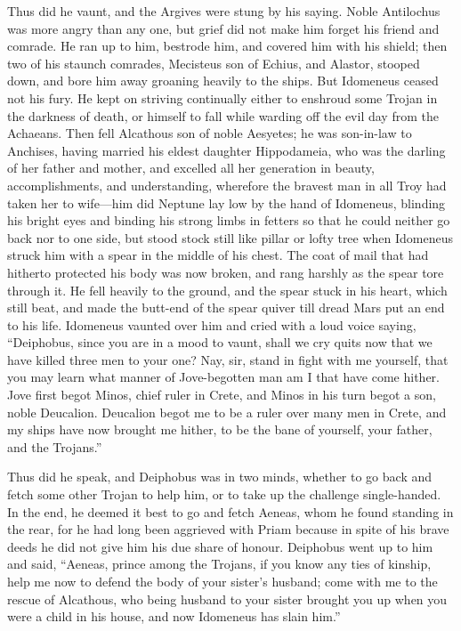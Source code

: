 Thus did he vaunt, and the Argives were stung by his saying. Noble
Antilochus was more angry than any one, but grief did not make him forget
his friend and comrade. He ran up to him, bestrode him, and covered him
with his shield; then two of his staunch comrades, Mecisteus son of
Echius, and Alastor, stooped down, and bore him away groaning heavily to
the ships. But Idomeneus ceased not his fury. He kept on striving
continually either to enshroud some Trojan in the darkness of death, or
himself to fall while warding off the evil day from the Achaeans. Then
fell Alcathous son of noble Aesyetes; he was son-in-law to Anchises,
having married his eldest daughter Hippodameia, who was the darling of her
father and mother, and excelled all her generation in beauty,
accomplishments, and understanding, wherefore the bravest man in all Troy
had taken her to wife—him did Neptune lay low by the hand of
Idomeneus, blinding his bright eyes and binding his strong limbs in
fetters so that he could neither go back nor to one side, but stood stock
still like pillar or lofty tree when Idomeneus struck him with a spear in
the middle of his chest. The coat of mail that had hitherto protected his
body was now broken, and rang harshly as the spear tore through it. He
fell heavily to the ground, and the spear stuck in his heart, which still
beat, and made the butt-end of the spear quiver till dread Mars put an end
to his life. Idomeneus vaunted over him and cried with a loud voice
saying, “Deiphobus, since you are in a mood to vaunt, shall we cry quits
now that we have killed three men to your one? Nay, sir, stand in fight
with me yourself, that you may learn what manner of Jove-begotten man am I
that have come hither. Jove first begot Minos, chief ruler in Crete, and
Minos in his turn begot a son, noble Deucalion. Deucalion begot me to be a
ruler over many men in Crete, and my ships have now brought me hither, to
be the bane of yourself, your father, and the Trojans.”

Thus did he speak, and Deiphobus was in two minds, whether to go back and
fetch some other Trojan to help him, or to take up the challenge
single-handed. In the end, he deemed it best to go and fetch Aeneas, whom
he found standing in the rear, for he had long been aggrieved with Priam
because in spite of his brave deeds he did not give him his due share of
honour. Deiphobus went up to him and said, “Aeneas, prince among the
Trojans, if you know any ties of kinship, help me now to defend the body
of your sister’s husband; come with me to the rescue of Alcathous, who
being husband to your sister brought you up when you were a child in his
house, and now Idomeneus has slain him.”

